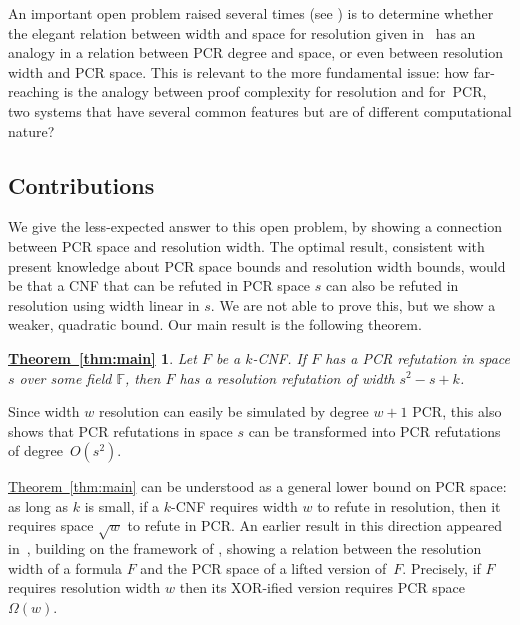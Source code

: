 \documentclass[11pt]{article}
\numberwithin{equation}{section}
\theoremstyle{definition}
\theoremstyle{plain}
\newcommand{\expref}[2]{\hyperref[#2]{#1~\ref{#2}}}
\newcommand\bbF{\mathbb{F}}
\newtheorem*{mainthm}{\expref{Theorem}{thm:main}}
\begin{document}
An important open problem raised several times 
(see \cite{NorSurvey15,DBLP:journals/jacm/BonacinaG15,DBLP:journals/siamcomp/FilmusLNRT15,DBLP:conf/icalp/BerkholzN16,DBLP:conf/icalp/FilmusLMNV13,DBLP:journals/tocl/FilmusLMNV15}) 
is to determine whether the elegant relation between width and space for resolution given in~\cite{DBLP:journals/jcss/AtseriasD08} 
has an analogy in a relation between PCR degree and space, or even between resolution width and PCR space. 
This is relevant to the more fundamental issue: how far-reaching is the analogy between proof complexity for resolution
and for~PCR, two systems that have several common features but are of different computational nature? 


\subsection{Contributions}\label{subsec:contributions}

We give the less-expected answer to this open problem, by showing a 
connection between PCR space and resolution width.
The optimal result, consistent with present knowledge about
PCR space  bounds and resolution width bounds,  would be that a CNF that can be refuted in PCR space $s$ 
can also be refuted in resolution using width linear in $s$.
We are not able to prove this, but we show
 a weaker, quadratic bound.
Our main result is the following theorem. 
\begin{mainthm} 
\emph{Let $F$ be a $k$-CNF. If $F$ has a PCR refutation in space $s$ over some field $\bbF$, 
then $F$ has a resolution refutation of width $s^2-s+k$.}
\end{mainthm}

Since width $w$ resolution  can easily be simulated by degree $w+1$ PCR, 
this also shows that PCR refutations in space $s$ can be transformed into  PCR refutations of degree~$O(s^2)$.  

\expref{Theorem}{thm:main} can be understood as a general lower bound on PCR space:
as long as $k$ is small, 
if a $k$-CNF requires width $w$ to refute in resolution, then 
it requires space $\sqrt{w}$ to refute in PCR. 
%
An earlier result in this direction
appeared in~\cite{DBLP:conf/icalp/FilmusLMNV13},
building on the framework of \cite{ABRW, DBLP:journals/jacm/BonacinaG15},
showing
a relation between the resolution width of a formula $F$ and the PCR space of a lifted version of~$F$.
Precisely,
if $F$ requires  resolution width $w$
then its XOR-ified version requires PCR space~$\Omega(w)$.
\end{document}
